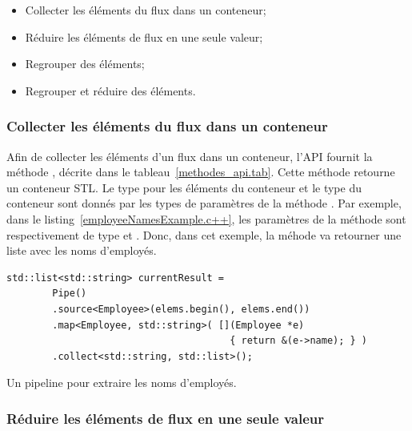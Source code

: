 \begin{itemize}
	\item Collecter les \'el\'ements du flux dans un conteneur;	

	\item R\'eduire les \'el\'ements de flux en une seule valeur;

	\item Regrouper des \'el\'ements;
	
	\item Regrouper et r\'eduire des \'el\'ements.
\end{itemize}

\subsubsection{Collecter les \'el\'ements du flux dans un conteneur}

Afin de collecter les \'el\'ements d'un flux dans un conteneur, l'{API} fournit la m\'ethode , d\'ecrite dans le tableau~\ref{methodes_api.tab}. Cette m\'ethode retourne un conteneur {STL}. Le type pour les \'el\'ements du conteneur et le type du conteneur sont donn\'es par les types de param\`etres  de la m\'ethode . Par exemple, dans le listing~\ref{employeeNamesExample.c++}, les param\`etres  de la m\'ethode  sont respectivement de type  et . Donc, dans cet exemple, la m\'ehode  va retourner une liste  avec les noms d'employ\'es.


\begin{Listing}[tbp]
\begin{lstlisting}[gobble=4]
    std::list<std::string> currentResult = 
        Pipe()
        .source<Employee>(elems.begin(), elems.end())
        .map<Employee, std::string>( [](Employee *e) 
                                       { return &(e->name); } )
        .collect<std::string, std::list>();
\end{lstlisting}
\caption{Un pipeline pour extraire les noms d'employ\'es.}
\label{employeeNamesExample.c++}
\end{Listing}


\subsubsection{R\'eduire les \'el\'ements de flux en une seule valeur}

